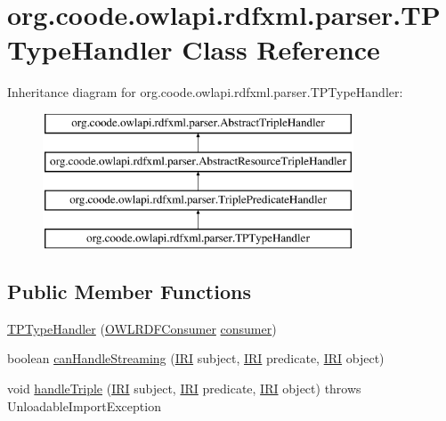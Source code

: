 \hypertarget{classorg_1_1coode_1_1owlapi_1_1rdfxml_1_1parser_1_1_t_p_type_handler}{\section{org.\-coode.\-owlapi.\-rdfxml.\-parser.\-T\-P\-Type\-Handler Class Reference}
\label{classorg_1_1coode_1_1owlapi_1_1rdfxml_1_1parser_1_1_t_p_type_handler}
}
Inheritance diagram for org.\-coode.\-owlapi.\-rdfxml.\-parser.\-T\-P\-Type\-Handler\-:\begin{figure}[H]
\begin{center}
\leavevmode
\includegraphics[height=4.000000cm]{classorg_1_1coode_1_1owlapi_1_1rdfxml_1_1parser_1_1_t_p_type_handler}
\end{center}
\end{figure}
\subsection*{Public Member Functions}
\begin{DoxyCompactItemize}
\item 
\hyperlink{classorg_1_1coode_1_1owlapi_1_1rdfxml_1_1parser_1_1_t_p_type_handler_a34479921c4da4375b61731e62d5ac18d}{T\-P\-Type\-Handler} (\hyperlink{classorg_1_1coode_1_1owlapi_1_1rdfxml_1_1parser_1_1_o_w_l_r_d_f_consumer}{O\-W\-L\-R\-D\-F\-Consumer} \hyperlink{classorg_1_1coode_1_1owlapi_1_1rdfxml_1_1parser_1_1_abstract_triple_handler_a4ccf4d898ff01eb1cadfa04b23d54e9c}{consumer})
\item 
boolean \hyperlink{classorg_1_1coode_1_1owlapi_1_1rdfxml_1_1parser_1_1_t_p_type_handler_a1018a42591d4673bf0b53211c9239d61}{can\-Handle\-Streaming} (\hyperlink{classorg_1_1semanticweb_1_1owlapi_1_1model_1_1_i_r_i}{I\-R\-I} subject, \hyperlink{classorg_1_1semanticweb_1_1owlapi_1_1model_1_1_i_r_i}{I\-R\-I} predicate, \hyperlink{classorg_1_1semanticweb_1_1owlapi_1_1model_1_1_i_r_i}{I\-R\-I} object)
\item 
void \hyperlink{classorg_1_1coode_1_1owlapi_1_1rdfxml_1_1parser_1_1_t_p_type_handler_ace3b03d65378bc8f066126cba2f31563}{handle\-Triple} (\hyperlink{classorg_1_1semanticweb_1_1owlapi_1_1model_1_1_i_r_i}{I\-R\-I} subject, \hyperlink{classorg_1_1semanticweb_1_1owlapi_1_1model_1_1_i_r_i}{I\-R\-I} predicate, \hyperlink{classorg_1_1semanticweb_1_1owlapi_1_1model_1_1_i_r_i}{I\-R\-I} object)  throws Unloadable\-Import\-Exception 
\end{DoxyCompactItemize}
